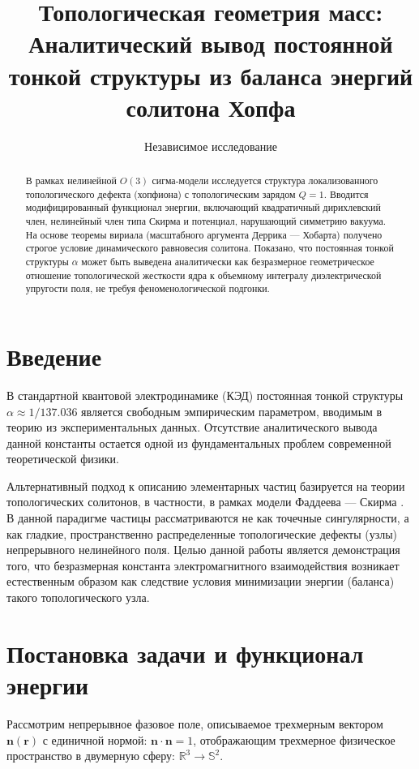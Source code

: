 \documentclass[12pt,a4paper]{article}
\begin{document}
\title{\textbf{Топологическая геометрия масс: Аналитический вывод постоянной тонкой структуры из баланса энергий солитона Хопфа}}
\author{Независимое исследование}
\date{}
\maketitle

\begin{abstract}
В рамках нелинейной $O(3)$ сигма-модели исследуется структура локализованного топологического дефекта (хопфиона) с топологическим зарядом $Q=1$. Вводится модифицированный функционал энергии, включающий квадратичный дирихлевский член, нелинейный член типа Скирма и потенциал, нарушающий симметрию вакуума. На основе теоремы вириала (масштабного аргумента Деррика — Хобарта) получено строгое условие динамического равновесия солитона. Показано, что постоянная тонкой структуры $\alpha$ может быть выведена аналитически как безразмерное геометрическое отношение топологической жесткости ядра к объемному интегралу диэлектрической упругости поля, не требуя феноменологической подгонки.
\end{abstract}

\section{Введение}
В стандартной квантовой электродинамике (КЭД) постоянная тонкой структуры $\alpha \approx 1/137.036$ является свободным эмпирическим параметром, вводимым в теорию из экспериментальных данных. Отсутствие аналитического вывода данной константы остается одной из фундаментальных проблем современной теоретической физики. 

Альтернативный подход к описанию элементарных частиц базируется на теории топологических солитонов, в частности, в рамках модели Фаддеева — Скирма \cite{Faddeev1997, Manton2004}. В данной парадигме частицы рассматриваются не как точечные сингулярности, а как гладкие, пространственно распределенные топологические дефекты (узлы) непрерывного нелинейного поля. Целью данной работы является демонстрация того, что безразмерная константа электромагнитного взаимодействия возникает естественным образом как следствие условия минимизации энергии (баланса) такого топологического узла.

\section{Постановка задачи и функционал энергии}
Рассмотрим непрерывное фазовое поле, описываемое трехмерным вектором $\mathbf{n}(\mathbf{r})$ с единичной нормой: $\mathbf{n} \cdot \mathbf{n} = 1$, отображающим трехмерное физическое пространство в двумерную сферу: $\mathbb{R}^3 \to \mathbb{S}^2$. 
\end{document}
